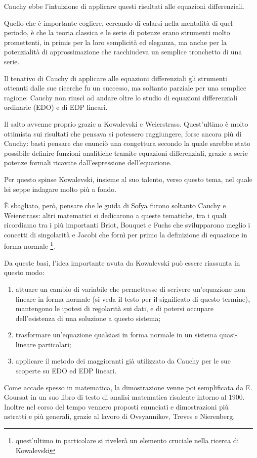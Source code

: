Cauchy ebbe l'intuizione di applicare questi risultati alle equazioni differenziali. 

Quello che è importante cogliere, cercando di calarsi nella mentalità di quel periodo, è che la teoria classica e le serie di potenze erano strumenti molto promettenti, in primis per la loro semplicità ed eleganza, ma anche per la potenzialità di approssimazione che racchiudeva un semplice tronchetto di una serie.

Il tenativo di Cauchy di applicare alle equazioni differenziali gli strumenti ottenuti dalle sue ricerche fu un successo, ma soltanto parziale per una semplice ragione: Cauchy non riuscì ad andare oltre lo studio di equazioni differenziali ordinarie (EDO) e di EDP lineari. 

Il salto avvenne proprio grazie a Kowalevski e Weierstrass. Quest'ultimo è molto ottimista sui risultati che pensava si potessero raggiungere, forse ancora più di Cauchy: basti pensare che enunciò una congettura secondo la quale sarebbe stato possibile definire funzioni analitiche tramite equazioni differenziali, grazie a serie potenze formali ricavate dall'espressione dell'equazione.

Per questo spinse Kowalevski, insieme al suo talento, verso questo tema, nel quale lei seppe indagare molto più a fondo.

È sbagliato, però, pensare che le guida di Sofya furono soltanto Cauchy e Weierstrass: altri matematici si dedicarono a queste tematiche, tra i quali ricordiamo tra i più importanti Briot, Bouquet e Fuchs che svilupparono meglio i concetti di singolarità e Jacobi che fornì per primo la definizione di equazione in forma normale
\footnote{quest'ultimo in particolare si rivelerà un elemento cruciale nella ricerca di Kowalevski}.

Da queste basi, l’idea importante avuta da Kowalevski può essere riassunta in questo modo: 
\begin{enumerate}
\item attuare un cambio di variabile che permettesse di scrivere un'equazione non lineare in forma normale (si veda il testo per il significato di questo termine), mantengono le ipotesi di regolarità sui dati, e di potersi occupare dell’esistenza di una soluzione a questo sistema;
\item trasformare un'equazione qualsiasi in forma normale in un sistema quasi-lineare particolari;
\item applicare il metodo dei maggioranti già utilizzato da Cauchy per le sue scoperte su EDO ed EDP lineari.
\end{enumerate}
Come accade spesso in matematica, la dimostrazione venne poi semplificata da E. Goursat in un suo libro di testo di analisi matematica risalente intorno al 1900. Inoltre nel corso del tempo vennero proposti enunciati e dimostrazioni più astratti e più generali, grazie al lavoro di Ovsyannikov, Treves e Nierenberg.

